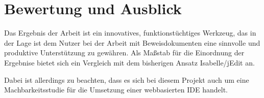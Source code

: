 \chapter{Bewertung und Ausblick}

Das Ergebnis der Arbeit ist ein innovatives, funktionstüchtiges Werkzeug, das in der Lage ist dem
Nutzer bei der Arbeit mit Beweisdokumenten eine sinnvolle und produktive Unterstützung zu gewähren.
Als Maßstab für die Einordnung der Ergebnise bietet sich ein Vergleich mit dem bisherigen Ansatz
Isabelle/jEdit an. 



Dabei ist allerdings zu beachten, dass es sich bei diesem Projekt auch um eine
Machbarkeitsstudie für die Umsetzung einer webbasierten IDE handelt.

%
%
%
% 
%
%
%
%
%
%
